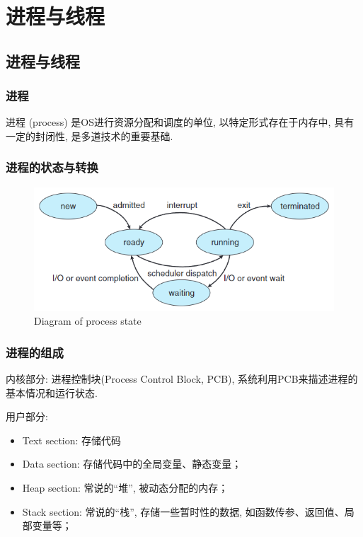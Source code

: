 \section{进程与线程}
\subsection{进程与线程}
\subsubsection{进程}
进程 (process) 是OS进行资源分配和调度的单位, 以特定形式存在于内存中, 具有一定的封闭性, 是多道技术的重要基础. 

\subsubsection{进程的状态与转换}
\begin{figure}[H]
    \centering
    \includegraphics[width=0.88\linewidth]{pic/OS3/Diagram of process state}
    \caption{Diagram of process state}
\end{figure}

\subsubsection{进程的组成}
内核部分: 进程控制块(Process Control Block, PCB), 系统利用PCB来描述进程的基本情况和运行状态. 

用户部分: 
\begin{itemize}
    \item Text section: 存储代码
    \item Data section: 存储代码中的全局变量、静态变量；
    \item Heap section: 常说的“堆”, 被动态分配的内存；
    \item Stack section: 常说的“栈”, 存储一些暂时性的数据, 如函数传参、返回值、局部变量等；
\end{itemize}

